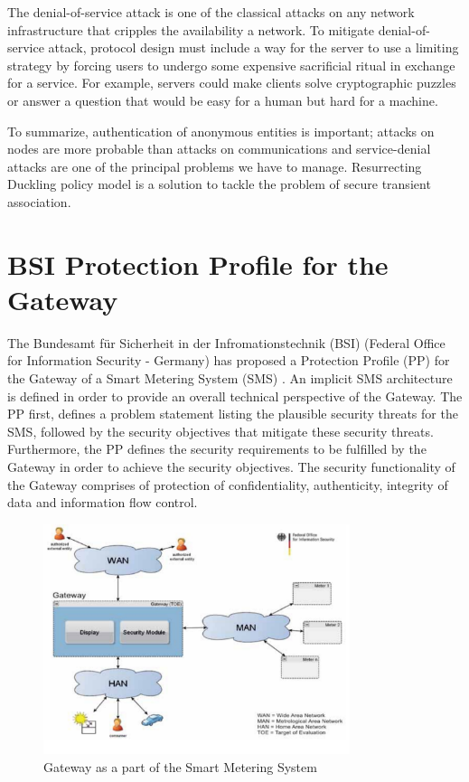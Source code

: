 The denial-of-service attack is one of the classical attacks on any network infrastructure that cripples the availability a network. To mitigate denial-of-service attack, protocol design must include a way for the server to use a limiting strategy by forcing users to undergo some expensive sacrificial ritual in exchange for a service. For example, servers could make clients solve cryptographic puzzles or answer a question that would be easy for a human but hard for a machine. 

To summarize, authentication of anonymous entities is important; attacks on nodes are more probable than attacks on communications and service-denial attacks are one of the principal problems we have to manage. Resurrecting Duckling policy model is a solution to tackle the problem of secure transient association.

\section{BSI Protection Profile for the Gateway}
The Bundesamt f\"ur Sicherheit in der Infromationstechnik (BSI) (Federal Office for Information Security - Germany) has proposed a Protection Profile (PP)  for the Gateway of a Smart Metering System (SMS) \cite{BSI_pp}. An implicit SMS architecture is defined in order to provide an overall technical perspective of the Gateway. The PP first, defines a problem statement listing the plausible security threats for the SMS, followed by the security objectives that mitigate these security threats. Furthermore, the PP defines the security requirements to be fulfilled by the Gateway in order to achieve the security objectives. The security functionality of the Gateway comprises of protection of confidentiality, authenticity, integrity of data and information flow control.

\begin{figure}[htb!]
\centering
\includegraphics[width=0.8\textwidth]{images/BSI_figure1}
\caption{Gateway as a part of the Smart Metering System \cite{BSI_pp}}
\label{fig:BSI_arch}
\end{figure}

